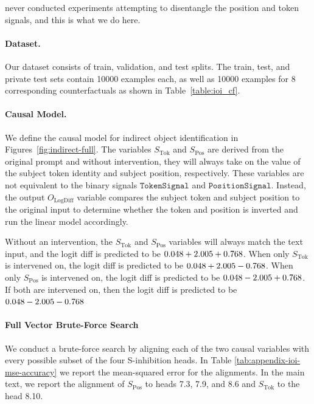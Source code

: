 \documentclass{article}
\theoremstyle{plain}
\theoremstyle{definition}
\theoremstyle{remark}
\newcommand{\token}{S_{\text{Tok}}}
\newcommand{\position}{S_{\text{Pos}}}
\newcommand{\tokensignal}{\texttt{TokenSignal}}
\newcommand{\positionsignal}{\texttt{PositionSignal}}
\newcommand{\outputvar}{O}
\begin{document}
\citet{wang2022interpretability} never conducted experiments attempting to disentangle the position and token signals, and this is what we do here.

\paragraph{Dataset.} Our dataset consists of train, validation, and test splits. The train, test, and private test sets contain 10000 examples each, as well as 10000 examples for 8 corresponding counterfactuals as shown in Table~\ref{table:ioi_cf}.


\paragraph{Causal Model.}
We define the causal model for indirect object identification in Figures~\ref{fig:indirect-full}. The variables $\token$ and $\position$ are derived from the original prompt and without intervention, they will always take on the value of the subject token identity and subject position, respectively. These variables are not equivalent to the binary signals $\tokensignal$ and $\positionsignal$. Instead, the output $\outputvar_{\text{LogDiff}}$ variable compares the subject token and subject position to the original input to determine whether the token and position is inverted and run the linear model accordingly. 

Without an intervention, the $\token$ and $\position$ variables will always match the text input, and the logit diff is predicted to be $0.048 + 2.005 + 0.768$. When only $\token$ is intervened on, the logit diff is predicted to be $0.048 + 2.005 - 0.768$. When only $\position$ is intervened on, the logit diff is predicted to be $0.048 - 2.005 + 0.768$. If both are intervened on, then the logit diff is predicted to be $0.048 - 2.005 - 0.768$

\paragraph{Full Vector Brute-Force Search} We conduct a brute-force search by aligning each of the two causal variables with every possible subset of the four S-inhibition heads. 
In Table \ref{tab:appendix-ioi-mse-accuracy} we report the mean-squared error for the alignments. 
In the main text, we report the alignment of $\position$ to heads 7.3, 7.9, and 8.6 and $\token$ to the head 8.10.
\end{document}
